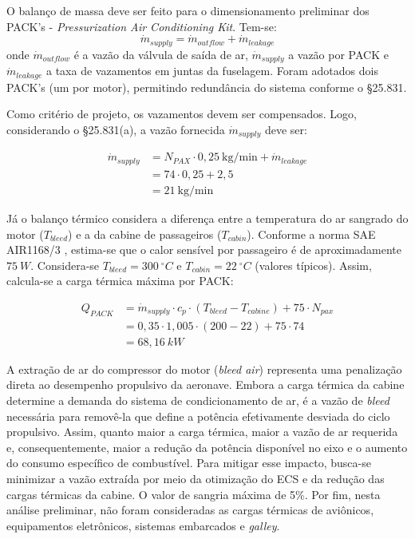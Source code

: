 O balanço de massa deve ser feito para o dimensionamento preliminar dos PACK's - \textit{Pressurization Air Conditioning Kit}. Tem-se:
\begin{equation}
    \dot{m}_{supply}=\dot{m}_{outflow}+\dot{m}_{leakage}
\end{equation} onde $\dot{m}_{outflow}$ é a vazão da válvula de saída de ar, $\dot{m}_{supply}$ a vazão por PACK e $\dot{m}_{leakage}$ a taxa de vazamentos em juntas da fuselagem. Foram adotados dois PACK's (um por motor), permitindo redundância do sistema conforme o \S 25.831.

Como critério de projeto, os vazamentos devem ser compensados. Logo, considerando o \S 25.831(a), a vazão fornecida $\dot{m}_{supply}$ deve ser:

\begin{align}
\dot{m}_{supply} &
= N_{PAX}\cdot 0,25\ \mathrm{kg/min}
+ \dot{m}_{leakage} \\
&= 74\cdot 0,25 + 2,5 \\
&= 21\ \mathrm{kg/min}
\end{align}

Já o balanço térmico considera a diferença entre a temperatura do ar sangrado do motor ($T_{bleed}$) e a da cabine de passageiros ($T_{cabin}$). Conforme a norma SAE AIR1168/3 \cite{SAE_AIR1168_3}, estima-se que o calor sensível por passageiro é de aproximadamente $75 \ W$. Considera-se $T_{bleed}=300 \ ^\circ C$  e $T_{cabin}=22 \ ^\circ C$ (valores típicos). Assim, calcula-se a carga térmica máxima por PACK:

\begin{align}
Q_{PACK} & =\dot{m}_{supply}\cdot c_p\cdot (T_{bleed}-T_{cabine})+75\cdot N_{pax} \\
&=  0,35\cdot 1,005 \cdot (200-22)+75 \cdot 74\\
&= 68,16 \ kW
\end{align}

A extração de ar do compressor do motor (\textit{bleed air}) representa uma penalização direta ao desempenho propulsivo da aeronave. Embora a carga térmica da cabine determine a demanda do sistema de condicionamento de ar, é a vazão de \textit{bleed} necessária para removê-la que define a potência efetivamente desviada do ciclo propulsivo. Assim, quanto maior a carga térmica, maior a vazão de ar requerida e, consequentemente, maior a redução da potência disponível no eixo e o aumento do consumo específico de combustível. Para mitigar esse impacto, busca-se minimizar a vazão extraída por meio da otimização do ECS e da redução das cargas térmicas da cabine. O valor de sangria máxima de 5\%. Por fim, nesta análise preliminar, não foram consideradas as cargas térmicas de aviônicos, equipamentos eletrônicos, sistemas embarcados e \textit{galley}.


